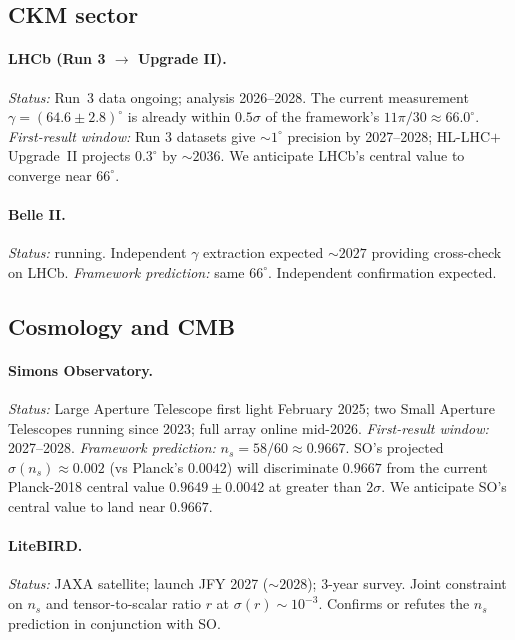 \documentclass[reprint,amsmath,amssymb,aps,prd,longbibliography,floatfix]{revtex4-2}
\begin{document}
\subsection*{CKM sector}

\paragraph{LHCb (Run 3 $\to$ Upgrade II).}
\emph{Status:} Run~3 data ongoing; analysis 2026--2028. The
current measurement $\gamma = (64.6 \pm 2.8)^\circ$ is already
within $0.5\sigma$ of the framework's $11\pi/30 \approx 66.0^\circ$.
\emph{First-result window:} Run 3 datasets give $\sim\!1^\circ$
precision by 2027--2028; HL-LHC$+$Upgrade~II projects $0.3^\circ$
by $\sim\!2036$. We anticipate LHCb's central value to converge
near $66^\circ$.

\paragraph{Belle II.}
\emph{Status:} running. Independent $\gamma$ extraction expected
$\sim\!2027$ providing cross-check on LHCb. \emph{Framework
prediction:} same $66^\circ$. Independent confirmation expected.

\subsection*{Cosmology and CMB}

\paragraph{Simons Observatory.}
\emph{Status:} Large Aperture Telescope first light February 2025;
two Small Aperture Telescopes running since 2023; full array
online mid-2026. \emph{First-result window:} 2027--2028.
\emph{Framework prediction:} $n_s = 58/60 \approx 0.9667$. SO's
projected $\sigma(n_s) \approx 0.002$ (vs Planck's $0.0042$) will
discriminate $0.9667$ from the current Planck-2018 central value
$0.9649 \pm 0.0042$ at greater than $2\sigma$. We anticipate SO's
central value to land near $0.9667$.

\paragraph{LiteBIRD.}
\emph{Status:} JAXA satellite; launch JFY 2027 ($\sim\!2028$);
3-year survey. Joint constraint on $n_s$ and tensor-to-scalar
ratio $r$ at $\sigma(r) \sim 10^{-3}$. Confirms or refutes the
$n_s$ prediction in conjunction with SO.
\end{document}
